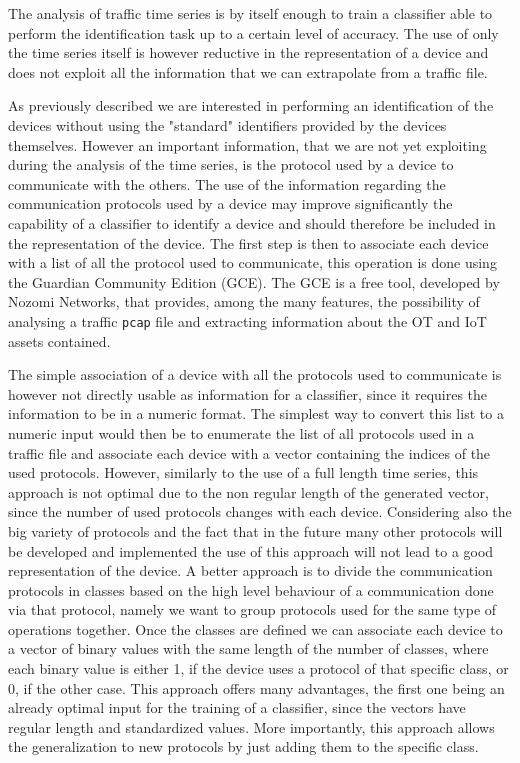 The analysis of traffic time series is by itself enough to train a classifier able to perform the identification task up to a certain level of accuracy. The use of only the time series itself is however reductive in the representation of a device and does not exploit all the information that we can extrapolate from a traffic file.

As previously described we are interested in performing an identification of the devices without using the "standard" identifiers provided by the devices themselves. However an important information, that we are not yet exploiting during the analysis of the time series, is the protocol used by a device to communicate with the others.
The use of the information regarding the communication protocols used by a device may improve significantly the capability of a classifier to identify a device and should therefore be included in the representation of the device.
The first step is then to associate each device with a list of all the protocol used to communicate, this operation is done using the Guardian Community Edition (GCE)\cite{gce}. The GCE is a free tool, developed by Nozomi Networks\cite{nozomi}, that provides, among the many features, the possibility of analysing a traffic \texttt{pcap} file and extracting information about the OT and IoT assets contained. 

The simple association of a device with all the protocols used to communicate is however not directly usable as information for a classifier, since it requires the information to be in a numeric format.
The simplest way to convert this list to a numeric input would then be to enumerate the list of all protocols used in a traffic file and associate each device with a vector containing the indices of the used protocols. However, similarly to the use of a full length time series, this approach is not optimal due to the non regular length of the generated vector, since the number of used protocols changes with each device. Considering also the big variety of protocols and the fact that in the future many other protocols will be developed and implemented the use of this approach will not lead to a good representation of the device.
A better approach is to divide the communication protocols in classes based on the high level behaviour of a communication done via that protocol, namely we want to group protocols used for the same type of operations together. Once the classes are defined we can associate each device to a vector of binary values with the same length of the number of classes, where each binary value is either 1, if the device uses a protocol of that specific class, or 0, if the other case. This approach offers many advantages, the first one being an already optimal input for the training of a classifier, since the vectors have regular length and standardized values. More importantly, this approach allows the generalization to new protocols by just adding them to the specific class.

